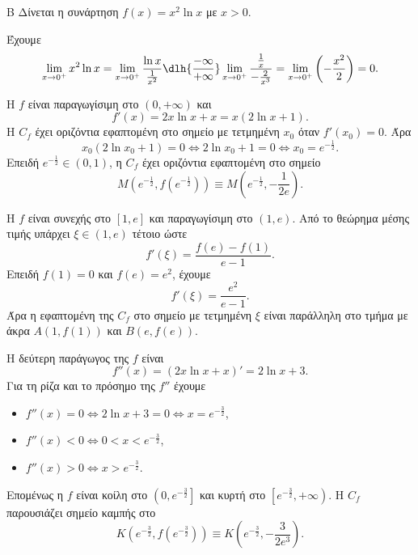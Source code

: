\begin{thema}{Β}
Δίνεται η συνάρτηση $f(x) = x^2 \ln x$ με $x > 0$.
\begin{erwthma}
\item Έχουμε
\[
\lim_{x\to0^+}x^2\ln x
=\lim_{x\to0^+}\frac{\ln x}{\frac{1}{x^2}}
\dlh{\frac{-\infty}{+\infty}}
\lim_{x\to0^+}\frac{\frac{1}{x}}{-\frac{2}{x^3}}
=\lim_{x\to0^+}\left(-\frac{x^2}{2}\right)=0.
\]

\item Η $f$ είναι παραγωγίσιμη στο $(0,+\infty)$ και
\[
f'(x)=2x\ln x+x=x(2\ln x+1).
\]
Η $C_f$ έχει οριζόντια εφαπτομένη στο σημείο με τετμημένη $x_0$ όταν
$f'(x_0)=0$. Άρα
\[
x_0(2\ln x_0+1)=0
\Leftrightarrow 2\ln x_0+1=0
\Leftrightarrow x_0=e^{-\frac12}.
\]
Επειδή $e^{-\frac12}\in(0,1)$, η $C_f$ έχει οριζόντια εφαπτομένη στο σημείο
\[
M\left(e^{-\frac12},f\left(e^{-\frac12}\right)\right)
\equiv M\left(e^{-\frac12},-\frac{1}{2e}\right).
\]

\item Η $f$ είναι συνεχής στο $[1,e]$ και παραγωγίσιμη στο $(1,e)$. Από το
θεώρημα μέσης τιμής υπάρχει $\xi\in(1,e)$ τέτοιο ώστε
\[
f'(\xi)=\frac{f(e)-f(1)}{e-1}.
\]
Επειδή $f(1)=0$ και $f(e)=e^2$, έχουμε
\[
f'(\xi)=\frac{e^2}{e-1}.
\]
Άρα η εφαπτομένη της $C_f$ στο σημείο με τετμημένη $\xi$ είναι παράλληλη στο
τμήμα με άκρα $A(1,f(1))$ και $B(e,f(e))$.

\item Η δεύτερη παράγωγος της $f$ είναι
\[
f''(x)=(2x\ln x+x)'=2\ln x+3.
\]
Για τη ρίζα και το πρόσημο της $f''$ έχουμε
\begin{itemize}
\item $f''(x)=0 \Leftrightarrow 2\ln x+3=0 \Leftrightarrow x=e^{-\frac32}$,
\item $f''(x)<0 \Leftrightarrow 0<x<e^{-\frac32}$,
\item $f''(x)>0 \Leftrightarrow x>e^{-\frac32}$.
\end{itemize}
Επομένως η $f$ είναι κοίλη στο $\left(0,e^{-\frac32}\right]$ και κυρτή στο
$\left[e^{-\frac32},+\infty\right)$. Η $C_f$ παρουσιάζει σημείο καμπής στο
\[
K\left(e^{-\frac32},f\left(e^{-\frac32}\right)\right)
\equiv K\left(e^{-\frac32},-\frac{3}{2e^3}\right).
\]
\end{erwthma}
\end{thema}
